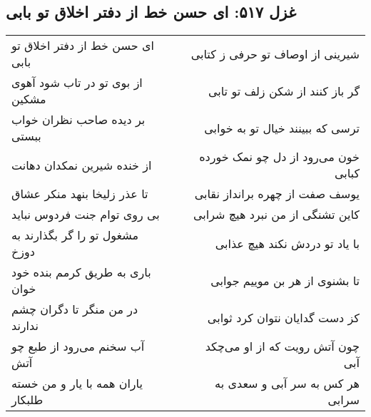 \begin{center}
\section*{غزل ۵۱۷: ای حسن خط از دفتر اخلاق تو بابی}
\label{sec:517}
\begin{longtable}{l p{0.5cm} r}
ای حسن خط از دفتر اخلاق تو بابی
&&
شیرینی از اوصاف تو حرفی ز کتابی
\\
از بوی تو در تاب شود آهوی مشکین
&&
گر باز کنند از شکن زلف تو تابی
\\
بر دیده صاحب نظران خواب ببستی
&&
ترسی که ببینند خیال تو به خوابی
\\
از خنده شیرین نمکدان دهانت
&&
خون می‌رود از دل چو نمک خورده کبابی
\\
تا عذر زلیخا بنهد منکر عشاق
&&
یوسف صفت از چهره برانداز نقابی
\\
بی روی توام جنت فردوس نباید
&&
کاین تشنگی از من نبرد هیچ شرابی
\\
مشغول تو را گر بگذارند به دوزخ
&&
با یاد تو دردش نکند هیچ عذابی
\\
باری به طریق کرمم بنده خود خوان
&&
تا بشنوی از هر بن موییم جوابی
\\
در من منگر تا دگران چشم ندارند
&&
کز دست گدایان نتوان کرد ثوابی
\\
آب سخنم می‌رود از طبع چو آتش
&&
چون آتش رویت که از او می‌چکد آبی
\\
یاران همه با یار و من خسته طلبکار
&&
هر کس به سر آبی و سعدی به سرابی
\\
\end{longtable}
\end{center}
